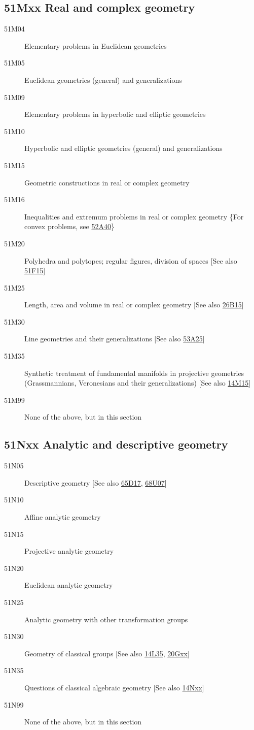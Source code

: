 \subsection*{51Mxx  Real and complex geometry }\label{51Mxx}
\begin{description}  
\item [51M04]\label{51M04} Elementary problems in Euclidean geometries
\item [51M05]\label{51M05} Euclidean geometries (general) and generalizations
\item [51M09]\label{51M09} Elementary problems in hyperbolic and elliptic geometries
\item [51M10]\label{51M10} Hyperbolic and elliptic geometries (general) and generalizations
\item [51M15]\label{51M15} Geometric constructions in real or complex geometry
\item [51M16]\label{51M16} Inequalities and extremum problems in real or complex geometry \{For convex problems, see \hyperref[52A40]{52A40}\}
\item [51M20]\label{51M20} Polyhedra and polytopes; regular figures, division of spaces [See also \hyperref[51F15]{51F15}]
\item [51M25]\label{51M25} Length, area and volume in real or complex geometry [See also \hyperref[26B15]{26B15}]
\item [51M30]\label{51M30} Line geometries and their generalizations [See also \hyperref[53A25]{53A25}]
\item [51M35]\label{51M35} Synthetic treatment of fundamental manifolds in projective geometries (Grassmannians, Veronesians and their generalizations) [See also \hyperref[14M15]{14M15}]
\item [51M99]\label{51M99} None of the above, but in this section
\end{description}
\subsection*{51Nxx  Analytic and descriptive geometry }\label{51Nxx}
\begin{description}  
\item [51N05]\label{51N05} Descriptive geometry [See also \hyperref[65D17]{65D17}, \hyperref[68U07]{68U07}]
\item [51N10]\label{51N10} Affine analytic geometry
\item [51N15]\label{51N15} Projective analytic geometry
\item [51N20]\label{51N20} Euclidean analytic geometry
\item [51N25]\label{51N25} Analytic geometry with other transformation groups
\item [51N30]\label{51N30} Geometry of classical groups [See also \hyperref[14L35]{14L35}, \hyperref[20Gxx]{20Gxx}]
\item [51N35]\label{51N35} Questions of classical algebraic geometry [See also \hyperref[14Nxx]{14Nxx}]
\item [51N99]\label{51N99} None of the above, but in this section
\end{description}
